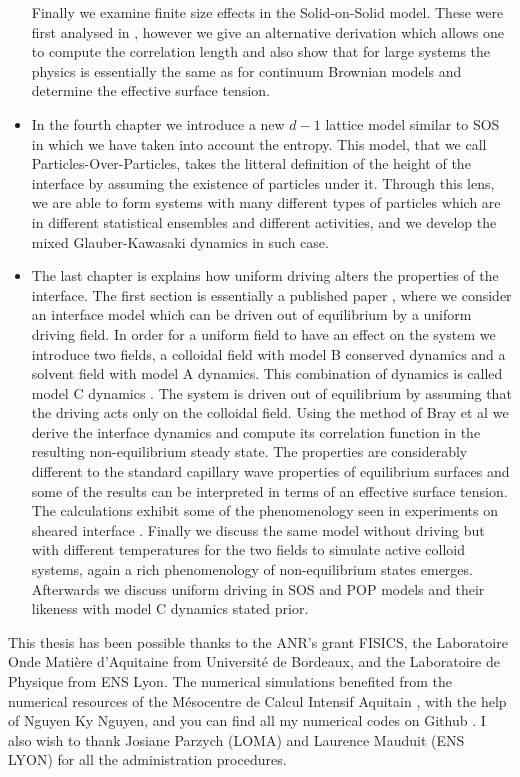 \begin{itemize}
    Finally we examine finite size effects in the Solid-on-Solid model. These were first analysed in \cite{privman_finite-size_1988-1}, however we give an alternative derivation which allows one to compute the correlation length and also show that for large systems the physics is essentially the same as for continuum Brownian models and determine the effective surface tension.
    \item In the fourth chapter we introduce a new $d-1$ lattice model similar to SOS in which we have taken into account the entropy. This model, that we call Particles-Over-Particles, takes the litteral definition of the height of the interface by assuming the existence of particles under it. Through this lens, we are able to form systems with many different types of particles which are in different statistical ensembles and different activities, and we develop the mixed Glauber-Kawasaki dynamics in such case.
   
    \item The last chapter is explains how uniform driving alters the properties of the interface. The first section is essentially a published paper \cite{dean_effect_2020}, where we consider an interface model which can be driven out of equilibrium by a uniform driving field. In order for a uniform field to have an effect on the system we introduce two fields, a colloidal field with model B conserved dynamics and a solvent field with model A dynamics. This combination of dynamics is called model C dynamics \cite{hohenberg_theory_1977}. The system is driven out of equilibrium by assuming that the driving acts only on the colloidal field. Using the method of Bray et al \cite{bray_interface_2001} we derive the interface dynamics and compute its correlation function in the resulting non-equilibrium steady state. The properties are considerably different to the standard capillary wave properties of equilibrium surfaces and some of the results can be interpreted in terms of an effective surface tension. The calculations exhibit some of the phenomenology seen in experiments on sheared interface \cite{derks_suppression_2006}. Finally we discuss the same model without driving but with different temperatures for the two fields to simulate active colloid systems, again a rich phenomenology of non-equilibrium states emerges.
    Afterwards we discuss uniform driving in SOS and POP models and their likeness with model C dynamics stated prior.

\end{itemize}

This thesis has been possible thanks to the ANR's grant FISICS, the Laboratoire Onde Matière d'Aquitaine from Université de Bordeaux, and the Laboratoire de Physique  from ENS Lyon. The numerical simulations benefited from the numerical resources of the Mésocentre de Calcul Intensif Aquitain \cite{noauthor_mesocentre_nodate}, with the help of Nguyen Ky Nguyen, and you can find all my numerical codes on Github \cite{paul_gersberg_github_2020}. I also wish to thank Josiane Parzych (LOMA) and Laurence Mauduit (ENS LYON) for all the administration procedures.
